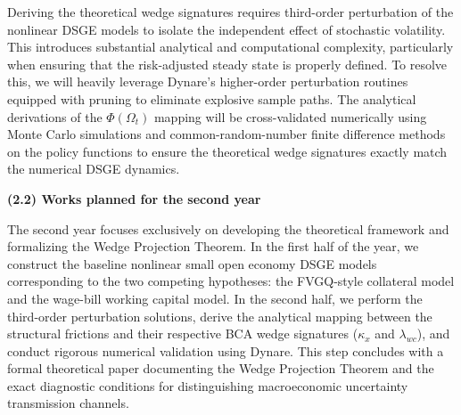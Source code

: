 \medskip

Deriving the theoretical wedge signatures requires third-order perturbation of the nonlinear DSGE models to isolate the independent effect of stochastic volatility. This introduces substantial analytical and computational complexity, particularly when ensuring that the risk-adjusted steady state is properly defined. To resolve this, we will heavily leverage Dynare's higher-order perturbation routines equipped with pruning to eliminate explosive sample paths. The analytical derivations of the $\Phi(\Omega_t)$ mapping will be cross-validated numerically using Monte Carlo simulations and common-random-number finite difference methods on the policy functions to ensure the theoretical wedge signatures exactly match the numerical DSGE dynamics.

\bigskip

\noindent\textbf{(2.2) Works planned for the second year}

\medskip

The second year focuses exclusively on developing the theoretical framework and formalizing the Wedge Projection Theorem. In the first half of the year, we construct the baseline nonlinear small open economy DSGE models corresponding to the two competing hypotheses: the FVGQ-style collateral model and the wage-bill working capital model. In the second half, we perform the third-order perturbation solutions, derive the analytical mapping between the structural frictions and their respective BCA wedge signatures ($\kappa_x$ and $\lambda_{wc}$), and conduct rigorous numerical validation using Dynare. This step concludes with a formal theoretical paper documenting the Wedge Projection Theorem and the exact diagnostic conditions for distinguishing macroeconomic uncertainty transmission channels.